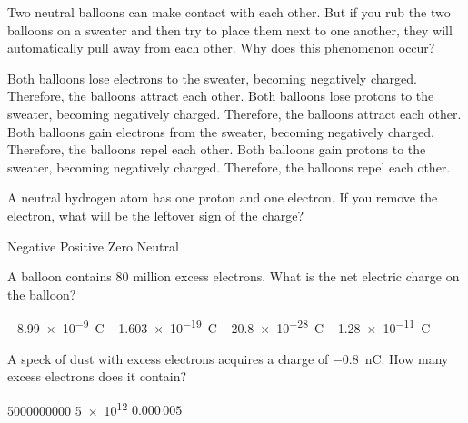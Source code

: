 \documentclass{exam}
\begin{document}
\begin{questions}
\question
Two neutral balloons can make contact with each other. But if you rub the two balloons on a sweater and then try to place them next to one another, they will automatically pull away from each other. Why does this phenomenon occur?

\hspace{1cm}

\clearpage
\begin{randomizechoices}
\choice Both balloons lose electrons to the sweater, becoming negatively charged. Therefore, the balloons attract each other.
\choice Both balloons lose protons to the sweater, becoming negatively charged. Therefore, the balloons attract each other.
\correctchoice Both balloons gain electrons from the sweater, becoming negatively charged. Therefore, the balloons repel each other.
\choice Both balloons gain protons to the sweater, becoming negatively charged. Therefore, the balloons repel each other.
\end{randomizechoices}




\question
A neutral hydrogen atom has one proton and one electron. If you remove the electron, what will be the leftover sign of the charge?

\begin{minipage}{0.25\textwidth}
    \begin{randomizechoices}
    \choice Negative
    \CorrectChoice Positive
    \choice Zero
    \choice Neutral
    \end{randomizechoices}
\end{minipage}%
\hspace{5mm}%
\begin{minipage}{0.2\textwidth}
    \centering
\end{minipage}

\question
A balloon contains 80 million excess electrons. What is the net electric charge on the balloon?

\begin{randomizechoices}
\choice \SI{-8.99e-9}{\coulomb}
\choice \SI{-1.603e-19}{C}
\choice \SI{-20.8e-28}{C}
\correctchoice \SI{-1.28e-11}{C}
\end{randomizechoices}

\question
A speck of dust with excess electrons acquires a charge of \qty{-0.8}{nC}. How many excess electrons does it contain?

\begin{randomizechoices}
    \correctchoice \num{5000000000}
    \choice \num{5e12}
    \choice $0.000\,005$
\end{randomizechoices}


\end{questions}
\end{document}
